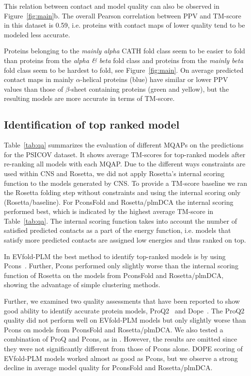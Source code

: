 \documentclass{bioinfo}
\begin{document}
This relation between contact and model quality can also be observed
in Figure~\ref{fig:main}b. The overall Pearson correlation between PPV and TM-score in
this dataset is 0.59, i.e. proteins with contact maps of lower quality tend
to be modeled less accurate. 


Proteins belonging to the {\it mainly alpha} CATH fold class seem to
be easier to fold than proteins from the {\it alpha \& beta} fold
class and proteins from the {\it mainly beta} fold class seem to be
hardest to fold, see Figure~\ref{fig:main}. On average predicted contact maps in
mainly $\alpha$-helical proteins (blue) have similar or lower PPV
values than those of $\beta$-sheet containing proteins (green and
yellow), but the resulting models are more accurate in terms of
TM-score.




\subsection{Identification of top ranked model}

Table~\ref{tab:qa} summarizes the evaluation of different MQAPs on the
predictions for the PSICOV dataset. It shows average TM-scores for
top-ranked models after re-ranking all models with each MQAP.
{\color{red}Due to the different ways constraints are used within CNS
and Rosetta, we did not apply Rosetta's internal scoring function to
the models generated by CNS.} {\color{red}To provide a TM-score
baseline we ran the Rosetta folding step without constraints and
using the internal scoring only (Rosetta/baseline).} {\color{red}For
PconsFold and Rosetta/plmDCA the internal scoring performed best,
which is indicated by the highest average TM-score in
Table~\ref{tab:qa}.} The internal scoring function takes into account
the number of satisfied predicted contacts as a part of the energy
function, i.e. models that satisfy more predicted contacts are
assigned low energies and thus ranked on top.

In  EVfold-PLM the best method to identify top-ranked models is by
using Pcons~\cite[]{lundstrom_pcons:_2001}.
Further, Pcons performed only slightly worse than the internal scoring
function of Rosetta on the models from PconsFold and
Rosetta/plmDCA, showing the advantage of simple clustering methods.

Further, we examined two quality assessments that have been reported
to show good ability to identify accurate protein models, ProQ2~\cite[]{ray_improved_2012} and Dope~\cite[]{Shen17075131}.
The ProQ2 quality did not perform well on EVfold-PLM models but only slightly worse than
Pcons on models from PconsFold and Rosetta/plmDCA. We also tested a
combination of ProQ and Pcons, as in \cite{wallner_pcons.net:_2007}. However, the results are omitted
since they were not significantly different from those of Pcons
alone. DOPE scoring of EVfold-PLM models worked almost as good as Pcons,
but we observe a strong decline in average model quality for PconsFold
and Rosetta/plmDCA. 
\end{document}

